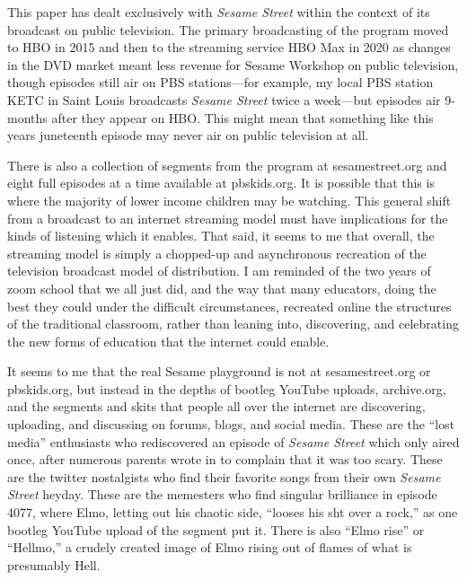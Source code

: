 \documentclass[12pt,letterpaper]{article}
\newcommand{\ses}{\textit{Sesame Street }}
\begin{document}
	This paper has dealt exclusively with \ses within the context of its 
	broadcast on public television. The primary broadcasting of the program
	moved to HBO in 2015 and then to the streaming service HBO Max in 2020 
	as changes in the DVD market meant 
	less revenue for Sesame Workshop on public television, though episodes 
	still air on PBS stations---for example, my local PBS station KETC in 
	Saint
	Louis broadcasts \textit{Sesame Street} twice a week---but episodes air
	9-months after they appear on HBO.\autocite{Koblin} This 
	might mean that something like this years juneteenth episode may never 
	air on public television at all. 

	There is also a collection of segments from the program at 
	sesamestreet.org and eight full 
	episodes at a time available at pbskids.org. It is possible that this is
	where the majority of lower income children may be watching. This 
	general shift from a broadcast to an internet streaming model must have
	implications for the kinds of listening which it enables. That said, it
	seems to me that overall, the streaming model is simply a chopped-up and
	asynchronous recreation of the television broadcast model of 
	distribution. I am reminded of the two years of zoom school that we all 
	just did, and the way that many educators, doing the best they could 
	under the difficult circumstances, recreated online the structures of 
	the traditional classroom, rather than leaning into, discovering, and 
	celebrating the new forms of education that the internet could enable. 

	It seems to me that the real Sesame playground is not at 
	sesamestreet.org or pbskids.org, but instead in the depths of bootleg 
	YouTube uploads, archive.org, and the segments and skits that 
	people all over the internet are discovering, uploading, and discussing 
	on forums, blogs, and social media. These are the ``lost media'' 
	enthusiasts who rediscovered an episode of \ses which only aired once, 
	after numerous parents wrote in to complain that it was too 
	scary.\autocite{NBC} These
	are the twitter nostalgists who find their favorite songs from their own
	\ses heyday. These are the memesters who find singular 
	brilliance in episode 4077, where Elmo, letting out his chaotic side, 
	``looses his sh\*t over a rock,'' as one bootleg YouTube upload of the 
	segment put it. There is also ``Elmo rise'' or ``Hellmo,'' a crudely 
	created image of Elmo rising out of flames of what is presumably Hell.
\end{document}
